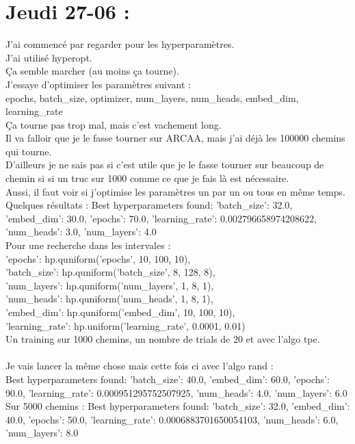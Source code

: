 \documentclass{article}
\begin{document}
\section*{Jeudi 27-06 :}
J'ai commencé par regarder pour les hyperparamètres.\\
J'ai utilisé hyperopt.\\
Ça semble marcher (au moins ça tourne).\\
J'essaye d'optimiser les paramètres suivant :\\
epochs, batch\_size, optimizer, num\_layers, num\_heads, embed\_dim, learning\_rate\\
Ça tourne pas trop mal, mais c'est vachement long.\\
Il va falloir que je le fasse tourner sur ARCAA, mais j'ai déjà les 100000 chemins qui tourne.\\
D'ailleurs je ne sais pas si c'est utile que je le fasse tourner sur beaucoup de chemin si si un truc sur 1000 comme ce que je fais là est nécessaire.\\
Aussi, il faut voir si j'optimise les paramètres un par un ou tous en même temps.\\
Quelques résultats :
Best hyperparameters found: 'batch\_size': 32.0, 'embed\_dim': 30.0, 'epochs': 70.0, 'learning\_rate': 0.002796658974208622, 'num\_heads': 3.0, 'num\_layers': 4.0\\
Pour une recherche dans les intervales :\\
'epochs': hp.quniform('epochs', 10, 100, 10),\\
'batch\_size': hp.quniform('batch\_size', 8, 128, 8),\\
'num\_layers': hp.quniform('num\_layers', 1, 8, 1),\\
'num\_heads': hp.quniform('num\_heads', 1, 8, 1),\\
'embed\_dim': hp.quniform('embed\_dim', 10, 100, 10),\\
'learning\_rate': hp.uniform('learning\_rate', 0.0001, 0.01)\\
Un training sur 1000 chemins, un nombre de trials de 20 et avec l'algo tpe.\\
\\
Je vais lancer la même chose mais cette fois ci avec l'algo rand :\\
Best hyperparameters found: 'batch\_size': 40.0, 'embed\_dim': 60.0, 'epochs': 90.0, 'learning\_rate': 0.000951295752507925, 'num\_heads': 4.0, 'num\_layers': 6.0\\
Sur 5000 chemins : Best hyperparameters found: 'batch\_size': 32.0, 'embed\_dim': 40.0, 'epochs': 50.0, 'learning\_rate': 0.0006883701650054103, 'num\_heads': 6.0, 'num\_layers': 8.0\\
\end{document}
